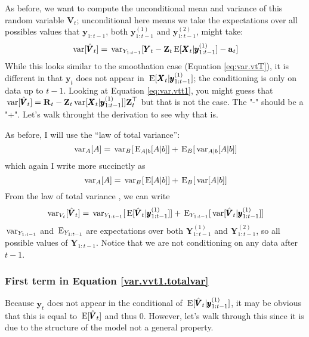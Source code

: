 \documentclass[]{article}
\def\XI{\mbox{\boldmath $\Xi$}}
\def\E{\,\textup{\textrm{E}}}
\def\RR{\mbox{$\mathbf R$}}	 \def\rr{\mbox{$\mathbf r$}} \def\Rb{\mbox{$\mathbf H$}}	\def\Rm{\mathbb{R}}
\def\VV{\mbox{$\pmb{V}$}}	\def\vv{\mbox{$\pmb{v}$}}
\def\XX{\mbox{$\pmb{X}$}}	\def\xx{\mbox{$\pmb{x}$}}
\def\YY{\mbox{$\pmb{Y}$}}	\def\yy{\mbox{$\pmb{y}$}}
\def\ZZ{\mbox{$\mathbf Z$}}	\def\zz{\mbox{$\mathbf z$}}	\def\Zb{\mbox{$\mathbf M$}} \def\Za{\mbox{$\mathbf N$}} \def\Zm{\XI}
\def\var{\,\textup{\textrm{var}}}
\begin{document}
As before, we want to compute the unconditional mean and variance of this random variable $\hat{\VV}_t$; unconditional here means we take the expectations over all possibles values that $\yy_{1:t-1}$, both $\yy^{(1)}_{1:t-1}$ and $\yy^{(2)}_{1:t-1}$, might take:
\begin{equation}\label{eq:var.vtt1}
\var[\hat{\VV}_t] = \var_{Y_{1:t-1}}[\YY_t - \ZZ_t\E[\XX_t|\yy^{(1)}_{1:t-1}] - \aa_t]
\end{equation}
While this looks similar to the smoothation case (Equation \ref{eq:var.vtT}), it is different in that $\yy_t$ does not appear in $\E[\XX_t|\yy^{(1)}_{1:t-1}]$; the conditioning is only on data up to $t-1$. Looking at Equation \ref{eq:var.vtt1}, you might guess that $\var[\hat{\VV}_t] = \RR_t - \ZZ_t\var[ \XX_t | \yy^{(1)}_{1:t-1}] ]\ZZ_t^\top$ but that is not the case. The "-" should be a "+". Let's walk throught the derivation to see why that is.

As before, I will use the ``law of total variance'':
\begin{equation}
\var_A[A] = \var_B[\E_{A|b}[A|b]] + \E_B[\var_{A|b}[A|b]]
\end{equation}
which again I write more succinctly as
\begin{equation}
\var_A[A] = \var_B[\E[A|b]] + \E_B[\var[A|b]]
\end{equation}
From the law of total variance , we can write
\begin{equation}\label{var.vvt1.totalvar}
\var_{V_t}[\hat{\VV}_t] = \var_{Y_{1:t-1}}[\E[\hat{\VV}_t|\yy^{(1)}_{1:t-1}]] + \E_{Y_{1:t-1}}[\var[\hat{\VV}_t|\yy^{(1)}_{1:t-1}]]
\end{equation}
$\var_{Y_{1:t-1}}$ and $\E_{Y_{1:t-1}}$ are expectations over both $\YY^{(1)}_{1:t-1}$ and $\YY^{(2)}_{1:t-1}$, so all possible values of $\YY_{1:t-1}$. Notice that we are not conditioning on any data after $t-1$.

\subsubsection{First term in Equation \ref{var.vvt1.totalvar}}

Because $\yy_t$ does not appear in the conditional of $\E[\hat{\VV}_t|\yy^{(1)}_{1:t-1}]$, it may be obvious that this is equal to $\E[\hat{\VV}_t]$ and thus 0. However, let's walk through this since it is due to the structure of the model not a general property.
\end{document}
